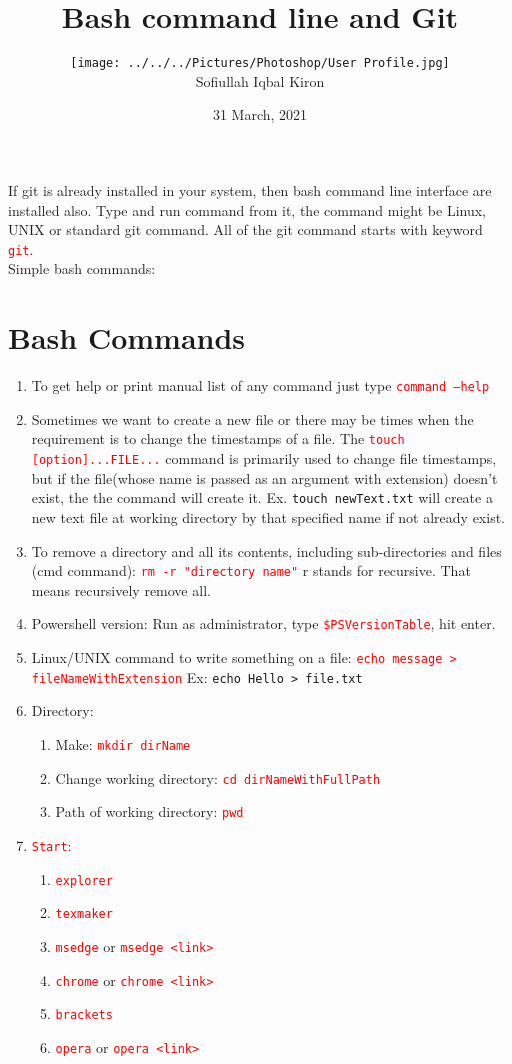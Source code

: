 \documentclass[10 pt]{article}
\title{Bash command line and Git}
\author
{
	\texttt{[image: ../../../Pictures/Photoshop/User Profile.jpg]} \\
	Sofiullah Iqbal Kiron \\
	\R{\rule{11 cm}{2 pt}}
}
\date{31 March, 2021}
\newcommand{\R}{\textcolor{red}} %
\newcommand{\T}{\texttt}
\begin{document}
\maketitle
\justify

If git is already installed in your system, then bash command line interface are installed also. Type and run command from it, the command might be Linux, UNIX or standard git command. All of the git command starts with keyword \R{\T{git}}.\\
Simple bash commands:

\section*{Bash Commands}
\begin{enumerate}
	\item To get help or print manual list of any command just type \R{\T{command --help}}
	\item Sometimes we want to create a new file or there may be times when the requirement is to change the timestamps of a file. The \R{\T{touch [option]...FILE...}} command is primarily used to change file timestamps, but if the file(whose name is passed as an argument with extension) doesn't exist, the the command will create it. Ex. \textcolor{red!70}{\texttt{touch newText.txt}} will create a new text file at working directory by that specified name if not already exist.
	\item To remove a directory and all its contents, including sub-directories and files (cmd command): \R{\T{rm -r "directory name"}} r stands for recursive. That means recursively remove all.
	\item Powershell version: Run as administrator, type \R{\T{\$PSVersionTable}}, hit enter.
	\item Linux/UNIX command to write something on a file: \R{\T{echo message > fileNameWithExtension}} Ex: \textcolor{red!70}{\texttt{echo Hello > file.txt}}
	
	\item Directory:
		\begin{enumerate}
			\item Make: \R{\T{mkdir dirName}}
			\item Change working directory: \R{\T{cd dirNameWithFullPath}}
			\item Path of working directory: \R{\T{pwd}}
		\end{enumerate}
	
	\item \R{\T{Start}}:
		\begin{enumerate}
			\item \R{\T{explorer}}
			\item \R{\T{texmaker}}
			\item \R{\T{msedge}} or \R{\T{msedge <link>}}
			\item \R{\T{chrome}} or \R{\T{chrome <link>}}
			\item \R{\T{brackets}}
			\item \R{\T{opera}} or \R{\T{opera <link>}}
			

\end{enumerate}
\end{enumerate}
\end{document}

